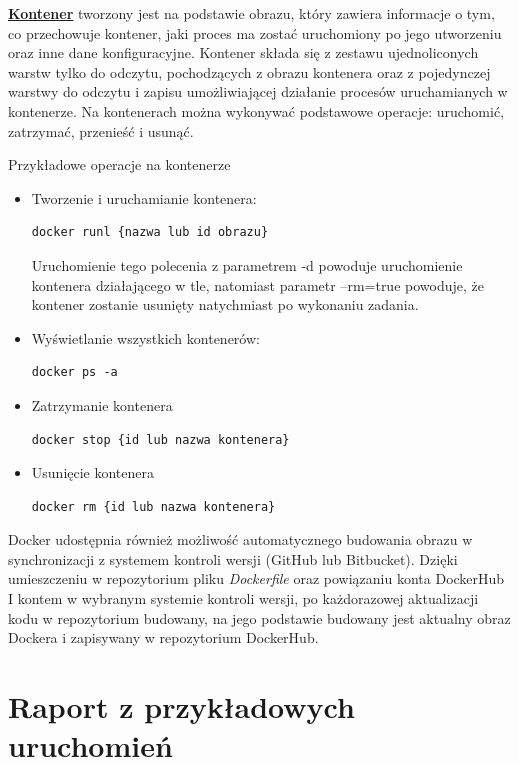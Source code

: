 	\textbf{\underline{Kontener}} tworzony jest na podstawie obrazu, który zawiera informacje o tym, co przechowuje kontener, jaki proces ma zostać uruchomiony po jego utworzeniu oraz inne dane konfiguracyjne. Kontener składa się z zestawu ujednoliconych warstw tylko do odczytu, pochodzących z obrazu kontenera oraz z pojedynczej warstwy do odczytu i zapisu umożliwiającej działanie procesów uruchamianych w kontenerze. Na kontenerach można wykonywać podstawowe operacje: uruchomić, zatrzymać, przenieść i usunąć.

Przykładowe operacje na kontenerze
\begin{itemize}
\item Tworzenie i uruchamianie kontenera:
\begin{lstlisting}[style=incode]
docker runl {nazwa lub id obrazu}
\end{lstlisting}
Uruchomienie tego polecenia z parametrem -d powoduje uruchomienie kontenera działającego w tle, natomiast parametr –rm=true powoduje, że kontener zostanie usunięty natychmiast po wykonaniu zadania.
\item Wyświetlanie wszystkich kontenerów:
\begin{lstlisting}[style=incode]
docker ps -a
\end{lstlisting}
\item Zatrzymanie kontenera
\begin{lstlisting}[style=incode]
docker stop {id lub nazwa kontenera}
\end{lstlisting}
\item Usunięcie kontenera
\begin{lstlisting}[style=incode]
docker rm {id lub nazwa kontenera}
\end{lstlisting}
\end{itemize}

	Docker udostępnia również możliwość automatycznego budowania obrazu w synchronizacji z systemem kontroli wersji (GitHub lub Bitbucket). Dzięki umieszczeniu w repozytorium pliku \textit{Dockerfile} oraz powiązaniu konta DockerHub I kontem w wybranym systemie kontroli wersji, po każdorazowej aktualizacji kodu w repozytorium budowany, na jego podstawie budowany jest aktualny obraz Dockera i zapisywany w repozytorium DockerHub.
	
	
	
	
\section{Raport z przykładowych uruchomień}


